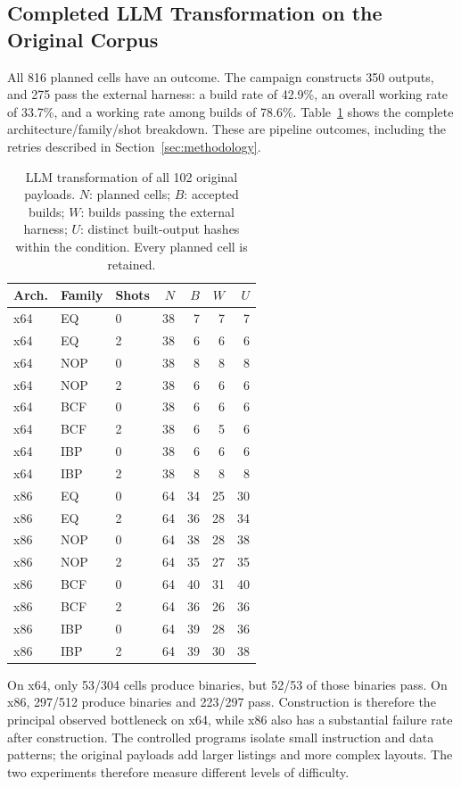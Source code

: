 \subsection{Completed LLM Transformation on the Original Corpus}
All 816 planned cells have an outcome. The campaign constructs 350
outputs, and 275 pass the external harness: a build rate of 42.9\%, an
overall working rate of 33.7\%, and a working rate among builds of 78.6\%.
Table~\ref{tab:payload_llm} shows the complete architecture/family/shot
breakdown. These are pipeline outcomes, including the retries described
in Section~\ref{sec:methodology}.


\begin{table}[t]
\caption{LLM transformation of all 102 original payloads. $N$: planned cells; $B$: accepted
builds; $W$: builds passing the external harness; $U$: distinct built-output
hashes within the condition. Every planned cell is retained.}
\label{tab:payload_llm}
\centering\small
\begin{tabular}{@{}lllrrrr@{}}
\toprule
Arch. & Family & Shots & $N$ & $B$ & $W$ & $U$ \\
\midrule
x64 & EQ & 0 & 38 & 7 & 7 & 7 \\
x64 & EQ & 2 & 38 & 6 & 6 & 6 \\
x64 & NOP & 0 & 38 & 8 & 8 & 8 \\
x64 & NOP & 2 & 38 & 6 & 6 & 6 \\
x64 & BCF & 0 & 38 & 6 & 6 & 6 \\
x64 & BCF & 2 & 38 & 6 & 5 & 6 \\
x64 & IBP & 0 & 38 & 6 & 6 & 6 \\
x64 & IBP & 2 & 38 & 8 & 8 & 8 \\
\midrule
x86 & EQ & 0 & 64 & 34 & 25 & 30 \\
x86 & EQ & 2 & 64 & 36 & 28 & 34 \\
x86 & NOP & 0 & 64 & 38 & 28 & 38 \\
x86 & NOP & 2 & 64 & 35 & 27 & 35 \\
x86 & BCF & 0 & 64 & 40 & 31 & 40 \\
x86 & BCF & 2 & 64 & 36 & 26 & 36 \\
x86 & IBP & 0 & 64 & 39 & 28 & 36 \\
x86 & IBP & 2 & 64 & 39 & 30 & 38 \\
\bottomrule
\end{tabular}
\end{table}



On x64, only 53/304 cells produce binaries, but 52/53 of those binaries
pass. On x86, 297/512 produce binaries and 223/297 pass. Construction is
therefore the principal observed bottleneck on x64, while x86 also has a
substantial failure rate after construction. The controlled programs isolate small instruction and data patterns;
the original payloads add larger listings and more complex layouts.
The two experiments therefore measure different levels of difficulty.

